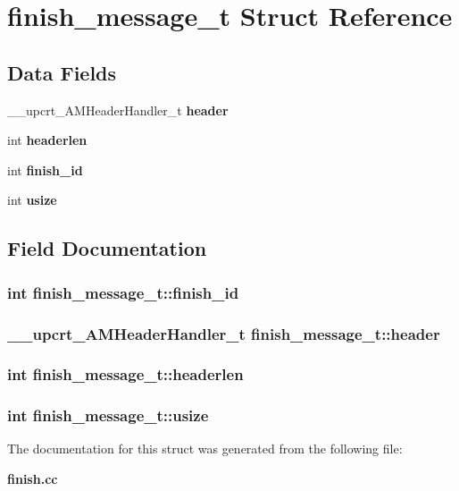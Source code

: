 \section{finish\_\-message\_\-t Struct Reference}
\label{structfinish__message__t}
\subsection*{Data Fields}
\begin{CompactItemize}
\item 
\_\-\_\-upcrt\_\-AMHeader\-Handler\_\-t {\bf header}
\item 
int {\bf headerlen}
\item 
int {\bf finish\_\-id}
\item 
int {\bf usize}
\end{CompactItemize}


\subsection{Field Documentation}
\subsubsection{\setlength{\rightskip}{0pt plus 5cm}int {\bf finish\_\-message\_\-t::finish\_\-id}}\label{structfinish__message__t_o2}


\subsubsection{\setlength{\rightskip}{0pt plus 5cm}\_\-\_\-upcrt\_\-AMHeader\-Handler\_\-t {\bf finish\_\-message\_\-t::header}}\label{structfinish__message__t_o0}


\subsubsection{\setlength{\rightskip}{0pt plus 5cm}int {\bf finish\_\-message\_\-t::headerlen}}\label{structfinish__message__t_o1}


\subsubsection{\setlength{\rightskip}{0pt plus 5cm}int {\bf finish\_\-message\_\-t::usize}}\label{structfinish__message__t_o3}




The documentation for this struct was generated from the following file:\begin{CompactItemize}
\item 
{\bf finish.cc}\end{CompactItemize}
